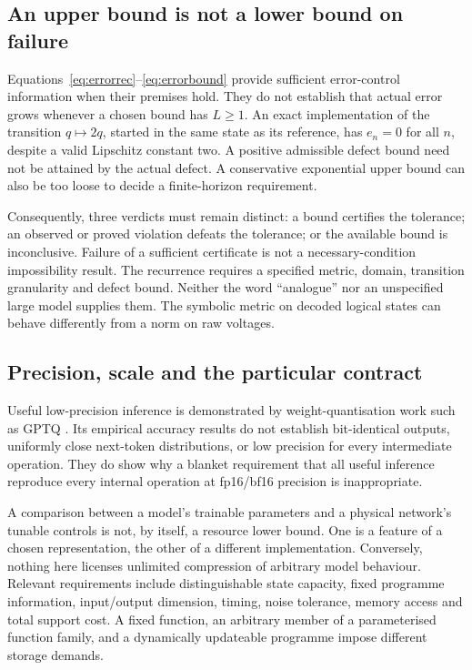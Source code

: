 \subsection{An upper bound is not a lower bound on failure}\label{subsec:bounddirection}
Equations~\eqref{eq:errorrec}--\eqref{eq:errorbound} provide sufficient error-control information when their premises hold. They do not establish that actual error grows whenever a chosen bound has $L\geq1$. An exact implementation of the transition $q\mapsto2q$, started in the same state as its reference, has $e_n=0$ for all $n$, despite a valid Lipschitz constant two. A positive admissible defect bound need not be attained by the actual defect. A conservative exponential upper bound can also be too loose to decide a finite-horizon requirement.

Consequently, three verdicts must remain distinct: a bound certifies the tolerance; an observed or proved violation defeats the tolerance; or the available bound is inconclusive. Failure of a sufficient certificate is not a necessary-condition impossibility result. The recurrence requires a specified metric, domain, transition granularity and defect bound. Neither the word ``analogue'' nor an unspecified large model supplies them. The symbolic metric on decoded logical states can behave differently from a norm on raw voltages.

\subsection{Precision, scale and the particular contract}
Useful low-precision inference is demonstrated by weight-quantisation work such as GPTQ \citep{gptq}. Its empirical accuracy results do not establish bit-identical outputs, uniformly close next-token distributions, or low precision for every intermediate operation. They do show why a blanket requirement that all useful inference reproduce every internal operation at fp16/bf16 precision is inappropriate.

A comparison between a model's trainable parameters and a physical network's tunable controls is not, by itself, a resource lower bound. One is a feature of a chosen representation, the other of a different implementation. Conversely, nothing here licenses unlimited compression of arbitrary model behaviour. Relevant requirements include distinguishable state capacity, fixed programme information, input/output dimension, timing, noise tolerance, memory access and total support cost. A fixed function, an arbitrary member of a parameterised function family, and a dynamically updateable programme impose different storage demands.

